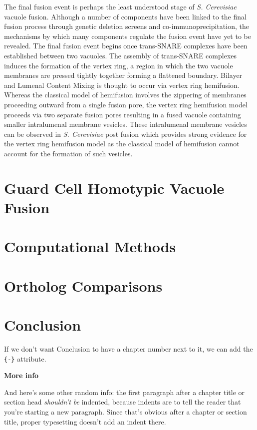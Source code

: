 \documentclass[12pt,twoside]{reedthesis}
\begin{document}
The final fusion event is perhaps the least understood stage of \emph{S. Cerevisiae} vacuole fusion. Although a number of components have been linked to the final fusion process through genetic deletion screens and co-immunoprecipitation, the mechanisms by which many components regulate the fusion event have yet to be revealed. The final fusion event begins once trans-SNARE complexes have been established between two vacuoles. The assembly of trans-SNARE complexes induces the formation of the vertex ring, a region in which the two vacuole membranes are pressed tightly together forming a flattened boundary. Bilayer and Lumenal Content Mixing is thought to occur via vertex ring hemifusion. Whereas the classical model of hemifusion involves the zippering of membranes proceeding outward from a single fusion pore, the vertex ring hemifusion model proceeds via two separate fusion pores resulting in a fused vacuole containing smaller intralumenal membrane vesicles. These intralumenal membrane vesicles can be observed in \emph{S. Cerevisiae} post fusion which provides strong evidence for the vertex ring hemifusion model as the classical model of hemifusion cannot account for the formation of such vesicles.

\chapter{Guard Cell Homotypic Vacuole Fusion}\label{GuardFusion}

\chapter{Computational Methods}\label{CompMethods}

\chapter{Ortholog Comparisons}\label{OrthoComp}

\chapter*{Conclusion}\label{conclusion}

If we don't want Conclusion to have a chapter number next to it, we can add the \texttt{\{-\}} attribute.

\textbf{More info}

And here's some other random info: the first paragraph after a chapter title or section head \emph{shouldn't be} indented, because indents are to tell the reader that you're starting a new paragraph. Since that's obvious after a chapter or section title, proper typesetting doesn't add an indent there.
\end{document}

